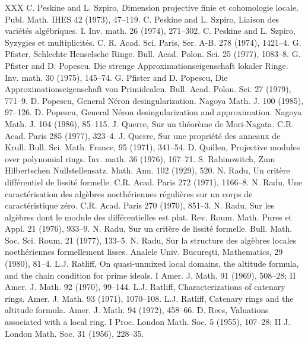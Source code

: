 \begin{thebibliography}{XXX}
 C. Peskine and L. Szpiro, Dimension projective finie et cohomologie locale. Publ. Math. IHES 42 (1973), 47--119.
 C. Peskine and L. Szpiro, Liaison des vari\'et\'es alg\'ebriques. I. Inv. math. 26 (1974), 271--302.
 C. Peskine and L. Szpiro, Syzygies et multiplicit\'es. C. R. Acad. Sci. Paris, Ser. A-B. 278 (1974), 1421--4.
 G. Pfister, Schlechte Henselsche Ringe. Bull. Acad. Polon. Sci. 25 (1977), 1083--8.
 G. Pfister and D. Popescu, Die strenge Approximationseigenschaft lokaler Ringe. Inv. math. 30 (1975), 145--74.
 G. Pfister and D. Popescu, Die Approximationseigenschaft von Primidealen. Bull. Acad. Polon. Sci. 27 (1979), 771--9.
 D. Popescu, General N\'eron desingularization. Nagoya Math. J. 100 (1985), 97--126.
 D. Popescu, General N\'eron desingularization and approximation. Nagoya Math. J. 104 (1986), 85--115.
 J. Querre, Sur un th\'eor\`eme de Mori-Nagata. C.R. Acad. Paris 285 (1977), 323--4.
 J. Querre, Sur une propri\'et\'e des anneaux de Krull. Bull. Sci. Math. France, 95 (1971), 341--54.
 D. Quillen, Projective modules over polynomial rings. Inv. math. 36 (1976), 167--71.
 S. Rabinowitch, Zum Hilbertschen Nullstellensatz. Math. Ann. 102 (1929), 520.
 N. Radu, Un crit\`ere diff\'erentiel de lissit\'e formelle. C.R. Acad. Paris 272 (1971), 1166--8.
 N. Radu, Une caract\'erisation des alg\`ebres noeth\'eriennes r\'eguli\`eres sur un corps de caract\'eristique z\'ero. C.R. Acad. Paris 270 (1970), 851--3.
 N. Radu, Sur les alg\`ebres dont le module des diff\'erentielles est plat. Rev. Roum. Math. Pures et Appl. 21 (1976), 933--9.
 N. Radu, Sur un crit\`ere de lissit\'e formelle. Bull. Math. Soc. Sci. Roum. 21 (1977), 133--5.
 N. Radu, Sur la structure des alg\`ebres locales noeth\'eriennes formellement lisses. Analele Univ. Bucure\c{s}ti, Mathematics, 29 (1980), 81--4.
 L.J. Ratliff, On quasi-unmixed local domains, the altitude formula, and the chain condition for prime ideals. I Amer. J. Math. 91 (1969), 508--28; II Amer. J. Math. 92 (1970), 99--144.
 L.J. Ratliff, Characterizations of catenary rings. Amer. J. Math. 93 (1971), 1070--108.
 L.J. Ratliff, Catenary rings and the altitude formula. Amer. J. Math. 94 (1972), 458--66.
 D. Rees, Valuations associated with a local ring. I Proc. London Math. Soc. 5 (1955), 107--28; II J. London Math. Soc. 31 (1956), 228--35.

\end{thebibliography}
